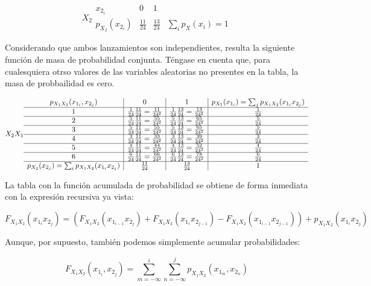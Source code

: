 \documentclass[11pt]{article}
\begin{document}
\[
X_2 \begin{array}{c|cc|c}
x_{2_i} & 0 & 1\\
\hline
p_{X_2}(x_{2_i}) & \frac{11}{24} & \frac{13}{24} & \sum_i p_X(x_i) = 1
\end{array}
\]

    Considerando que ambos lanzamientos son independientes, resulta la
siguiente función de masa de probabilidad conjunta. Téngase en cuenta
que, para cualesquiera otrso valores de las variables aleatorias no
presentes en la tabla, la masa de probbailidad es cero.

\[
X_2 \\X_1 \begin{array}{c|c|c|c}
p_{X_1X_2}(x_{1_i}, x_{2_j}) & 0 & 1 & p_{X_1}(x_{1_i}) = \sum_j p_{X_1X_2}(x_{1_i}x_{2_j})\\
\hline
1 & \frac{1}{24}\frac{11}{24} = \frac{11}{24^2} & \frac{1}{24}\frac{13}{24} = \frac{13}{24^2} & \frac{1}{24}\\
\hline
2 & \frac{5}{24}\frac{11}{24} = \frac{55}{24^2} & \frac{5}{24}\frac{13}{24} = \frac{65}{24^2} & \frac{5}{24}\\
\hline
3 & \frac{5}{24}\frac{11}{24} = \frac{55}{24^2} & \frac{5}{24}\frac{13}{24}  = \frac{65}{24^2} & \frac{5}{24}\\
\hline
4 & \frac{3}{24}\frac{11}{24} = \frac{33}{24^2} & \frac{3}{24}\frac{13}{24}  = \frac{39}{24^2} & \frac{3}{24}\\
\hline
5 & \frac{4}{24}\frac{11}{24} = \frac{44}{24^2}  & \frac{4}{24}\frac{13}{24} = \frac{52}{24^2}  & \frac{4}{24}\\
\hline
6 & \frac{6}{24}\frac{11}{24} = \frac{66}{24^2} & \frac{6}{24}\frac{13}{24} = \frac{78}{24^2}  & \frac{6}{24}\\
\hline
p_{X_2}(x_{2_j}) = \sum_i p_{X_1X_2}(x_{1_i}x_{2_j}) & \frac{11}{24} & \frac{13}{24} & 1
\end{array}
\]

    La tabla con la función acumulada de probabilidad se obtiene de forma
inmediata con la expresión recursiva ya vista:

\[F_{X_1X_2}(x_{1_i}x_{2_j})= \left(F_{X_1X_2}(x_{1_{i-1}}x_{2_{j}})+F_{X_1X_2}(x_{1_{i}}x_{2_{j-1}})- F_{X_1X_2}(x_{1_{i-1}}x_{2_{j-1}})\right) + p_{X_1X_2}(x_{1_i}x_{2_j})\]

Aunque, por supuesto, también podemos simplemente acumular
probabilidades:

\[F_{X_1X_2}(x_{1_i}, x_{2_j}) = \sum_{m=-\infty}^{i}\sum_{n=-\infty}^{j} p_{X_1X_2}(x_{1_m}, x_{2_n})\]
\end{document}
